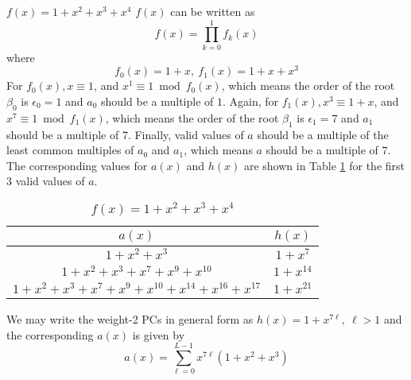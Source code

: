 \begin{example}
$f(x)=1+x^2+x^3+x^4$\newline
$f(x)$ can be written as 
$$f(x)=\prod_{k=0}^{1}f_k(x)$$
where 
$$f_0(x)=1+x,~f_1(x)=1+x+x^3$$ 
For $f_0(x), x \equiv 1$, and $x^1 \equiv 1 \bmod f_0(x)$, which means the order of the root $\beta_0$ is $\epsilon_0=1$ and $a_0$ should be a multiple of $1$. Again, for  $f_1(x), x^3 \equiv 1+x$, and $x^7 \equiv 1 \bmod f_1(x)$, which means the order of the root $\beta_1$ is $\epsilon_1=7$ and $a_1$ should be a multiple of $7$.
Finally, valid values of $a$ should be a multiple of the least common multiples of $a_0$ and $a_1$, which means $a$ should be a multiple of $7$.
The corresponding values for $a(x)$ and $h(x)$ are shown in Table \ref{novelTab1-a} for the first 3 valid values of $a$.
\begin{table}[htbp]
\renewcommand{\arraystretch}{1.3}
 \caption{$f(x)=1+x^2+x^3+x^4$}
 \centering
\begin{tabular}{c c } 
\hline
 $a(x)$ & $h(x)$ \\ [0.5ex] 
\hline\hline
$1+x^2+x^3$ & $1+x^7$\\ 
$1+x^2+x^3+x^7+x^9+x^{10}$ & $1+x^{14}$ \\
$1+x^2+x^3+x^7+x^9+x^{10}+x^{14}+x^{16}+x^{17}$ & $1+x^{21}$
\end{tabular}
 \label{novelTab1-a}
\end{table}

We may write the weight-2 PCs in general form as $h(x)=1+x^{7\ell},~\ell>1$ and the corresponding $a(x)$ is given by 
\begin{equation*}
a(x)=\sum_{\ell=0}^{L-1} x^{7\ell}(1+x^2+x^3)
\end{equation*}
\end{example}

